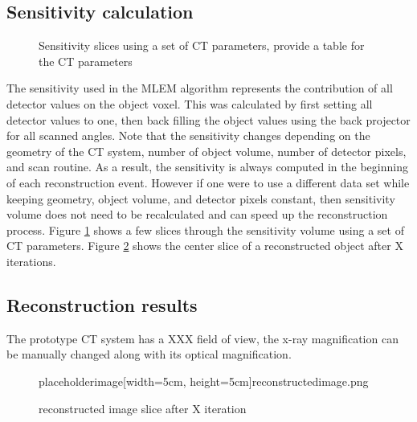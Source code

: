 \subsection{Sensitivity calculation}

\begin{figure}
\centering
{}
\label{fig:sensitivityslices}
\caption{Sensitivity slices using a set of CT parameters, provide a table for the CT parameters}
\end{figure}

The sensitivity used in the MLEM algorithm represents the contribution of all detector values on the object voxel.  This was calculated by first setting all detector values to one, then back filling the object values using the back projector for all scanned angles.  Note that the sensitivity changes depending on the geometry of the CT system, number of object volume, number of detector pixels, and scan routine.  As a result, the sensitivity is always computed in the beginning of each reconstruction event.  However if one were to use a different data set while keeping geometry, object volume, and detector pixels constant, then sensitivity volume does not need to be recalculated and can speed up the reconstruction process.  Figure \ref{fig:sensitivityslices} shows a few slices through the sensitivity volume using a set of CT parameters.
Figure \ref{fig:reconstructedimage} shows the center slice of a reconstructed object after X iterations.

\subsection{Reconstruction results}
The prototype CT system has a XXX field of view, the x-ray magnification can be manually changed along with its optical magnification.  
\begin{figure}
\centering
placeholderimage[width=5cm, height=5cm]{reconstructedimage.png}
\label{fig:reconstructedimage}
\caption{reconstructed image slice after X iteration}
\end{figure}

